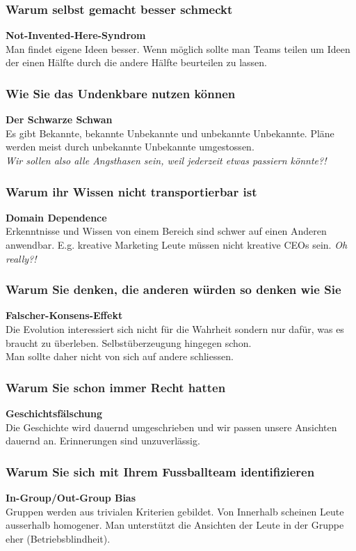 \documentclass[a4paper, twocolumn]{article}
\begin{document}
\subsubsection*{Warum selbst gemacht besser schmeckt}
\textbf{Not-Invented-Here-Syndrom}\\
Man findet eigene Ideen besser. Wenn möglich sollte man Teams teilen um Ideen der einen Hälfte durch die andere Hälfte beurteilen zu lassen.

\subsubsection*{Wie Sie das Undenkbare nutzen können}
\textbf{Der Schwarze Schwan}\\
Es gibt Bekannte, bekannte Unbekannte und unbekannte Unbekannte. Pläne werden meist durch unbekannte Unbekannte umgestossen.\\
\textit{Wir sollen also alle Angsthasen sein, weil jederzeit etwas passiern könnte?!}

\subsubsection*{Warum ihr Wissen nicht transportierbar ist}
\textbf{Domain Dependence}\\
Erkenntnisse und Wissen von einem Bereich sind schwer auf einen Anderen anwendbar. E.g. kreative Marketing Leute müssen nicht kreative CEOs sein.
\textit{Oh really?!}

\subsubsection*{Warum Sie denken, die anderen würden so denken wie Sie}
\textbf{Falscher-Konsens-Effekt}\\
Die Evolution interessiert sich nicht für die Wahrheit sondern nur dafür, was es braucht zu überleben. Selbstüberzeugung hingegen schon.\\
Man sollte daher nicht von sich auf andere schliessen.

\subsubsection*{Warum Sie schon immer Recht hatten}
\textbf{Geschichtsfälschung}\\
Die Geschichte wird dauernd umgeschrieben und wir passen unsere Ansichten dauernd an. Erinnerungen sind unzuverlässig.

\subsubsection*{Warum Sie sich mit Ihrem Fussballteam identifizieren}
\textbf{In-Group/Out-Group Bias}\\
Gruppen werden aus trivialen Kriterien gebildet. Von Innerhalb scheinen Leute ausserhalb homogener. Man unterstützt die Ansichten der Leute in der Gruppe eher (Betriebsblindheit).
\end{document}
